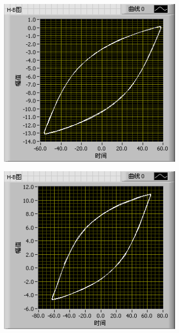 \documentclass{ctexart}
\begin{document}
\begin{figure}[H]
\begin{subfigure}{0.32\linewidth}
  \end{subfigure}
  \begin{subfigure}{0.32\linewidth}
    \includegraphics[width=\linewidth]{LabVIEW使用基础/铁材料的磁滞现象和磁滞回线/9V.png}
  \end{subfigure}
  \begin{subfigure}{0.32\linewidth}
    \includegraphics[width=\linewidth]{LabVIEW使用基础/铁材料的磁滞现象和磁滞回线/10V.png}

\end{subfigure}
\end{figure}
\end{document}

